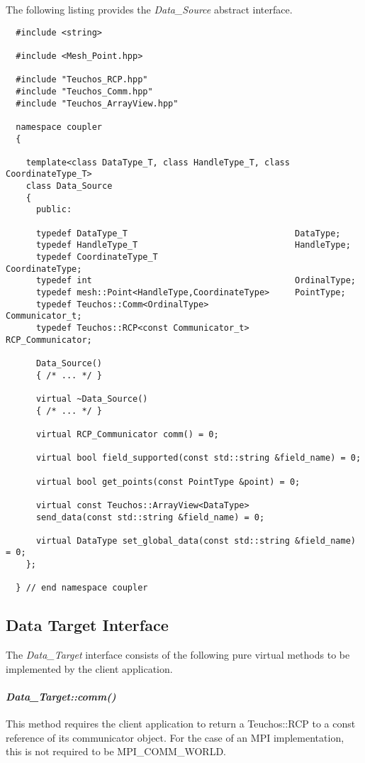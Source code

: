 \documentclass[letterpaper]{article}
\begin{document}
The following listing provides the {\sl Data\_Source} abstract
interface. 

\begin{lstlisting}
  #include <string>

  #include <Mesh_Point.hpp>

  #include "Teuchos_RCP.hpp"
  #include "Teuchos_Comm.hpp" 
  #include "Teuchos_ArrayView.hpp"

  namespace coupler
  {

    template<class DataType_T, class HandleType_T, class CoordinateType_T>
    class Data_Source 
    {
      public:

      typedef DataType_T                                 DataType;
      typedef HandleType_T                               HandleType;
      typedef CoordinateType_T                           CoordinateType;
      typedef int                                        OrdinalType;
      typedef mesh::Point<HandleType,CoordinateType>     PointType;
      typedef Teuchos::Comm<OrdinalType>                 Communicator_t;
      typedef Teuchos::RCP<const Communicator_t>         RCP_Communicator;

      Data_Source()
      { /* ... */ }

      virtual ~Data_Source()
      { /* ... */ }

      virtual RCP_Communicator comm() = 0;

      virtual bool field_supported(const std::string &field_name) = 0;

      virtual bool get_points(const PointType &point) = 0;

      virtual const Teuchos::ArrayView<DataType> 
      send_data(const std::string &field_name) = 0;

      virtual DataType set_global_data(const std::string &field_name) = 0;
    };

  } // end namespace coupler
\end{lstlisting}

\subsection{Data Target Interface}

The {\sl Data\_Target} interface consists of the following pure
virtual methods to be implemented by the client application.

\paragraph{\sl Data\_Target::comm()}
This method requires the client application to return a Teuchos::RCP
to a const reference of its communicator object. For the case of an
MPI implementation, this is not required to be MPI\_COMM\_WORLD.
\end{document}
